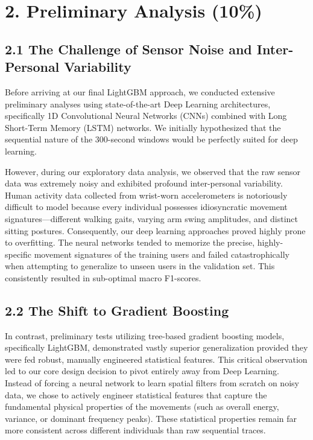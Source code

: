 \documentclass[12pt, a4paper]{article}
\begin{document}
\section*{2. Preliminary Analysis (10\%)}

\subsection*{2.1 The Challenge of Sensor Noise and Inter-Personal Variability}
Before arriving at our final LightGBM approach, we conducted extensive preliminary analyses using state-of-the-art Deep Learning architectures, specifically 1D Convolutional Neural Networks (CNNs) combined with Long Short-Term Memory (LSTM) networks. We initially hypothesized that the sequential nature of the 300-second windows would be perfectly suited for deep learning.

However, during our exploratory data analysis, we observed that the raw sensor data was extremely noisy and exhibited profound inter-personal variability. Human activity data collected from wrist-worn accelerometers is notoriously difficult to model because every individual possesses idiosyncratic movement signatures—different walking gaits, varying arm swing amplitudes, and distinct sitting postures. Consequently, our deep learning approaches proved highly prone to overfitting. The neural networks tended to memorize the precise, highly-specific movement signatures of the training users and failed catastrophically when attempting to generalize to unseen users in the validation set. This consistently resulted in sub-optimal macro F1-scores.

\subsection*{2.2 The Shift to Gradient Boosting}
In contrast, preliminary tests utilizing tree-based gradient boosting models, specifically LightGBM, demonstrated vastly superior generalization provided they were fed robust, manually engineered statistical features. This critical observation led to our core design decision to pivot entirely away from Deep Learning. Instead of forcing a neural network to learn spatial filters from scratch on noisy data, we chose to actively engineer statistical features that capture the fundamental physical properties of the movements (such as overall energy, variance, or dominant frequency peaks). These statistical properties remain far more consistent across different individuals than raw sequential traces.
\end{document}

